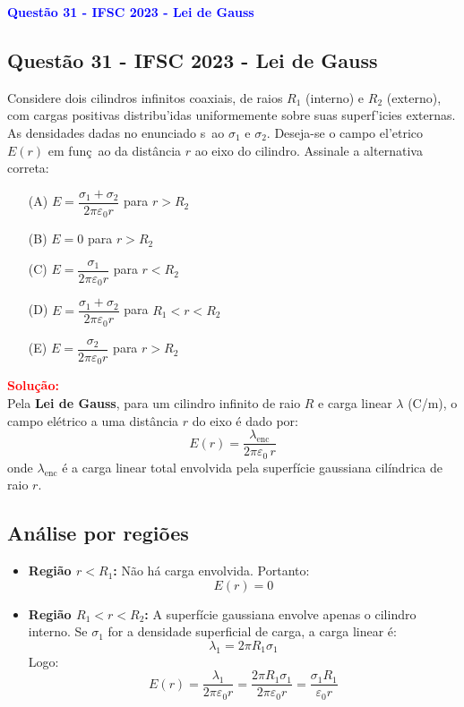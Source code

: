 \begin{flushleft}
\textbf{\textcolor{blue}{\Large Quest\~ao 31 - IFSC 2023 - Lei de Gauss}}\
\noindent

\subsection{Quest\~ao 31 - IFSC 2023 - Lei de Gauss}
Considere dois cilindros infinitos coaxiais, de raios $R_1$ (interno) e $R_2$ (externo), com cargas positivas distribu'idas 
uniformemente sobre suas superf'icies externas. As densidades dadas no enunciado s~ao $\sigma_1$ e $\sigma_2$. 
Deseja-se o campo el'etrico $E(r)$ em fun\c{c}~ao da dist\^ancia $r$ ao eixo do cilindro. Assinale a alternativa correta:

\begin{itemize}
\item[(A)] $E = \dfrac{\sigma_1+\sigma_2}{2\pi\varepsilon_0 r}$ para $r>R_2$
\item[(B)] $E = 0$ para $r>R_2$
\item[(C)] $E = \dfrac{\sigma_1}{2\pi\varepsilon_0 r}$ para $r<R_2$
\item[(D)] $E = \dfrac{\sigma_1+\sigma_2}{2\pi\varepsilon_0 r}$ para $R_1<r<R_2$
\item[(E)] $E = \dfrac{\sigma_2}{2\pi\varepsilon_0 r}$ para $r>R_2$
\end{itemize}

\vspace{0.5cm}

\textcolor{red}{\textbf{Solução:}}\\

Pela \textbf{Lei de Gauss}, para um cilindro infinito de raio $R$ e carga linear $\lambda$ (C/m), o campo elétrico a uma distância $r$ do eixo é dado por:
\[
E(r) = \frac{\lambda_{\text{enc}}}{2\pi \varepsilon_0 \, r}
\]
onde $\lambda_{\text{enc}}$ é a carga linear total envolvida pela superfície gaussiana cilíndrica de raio $r$.

\subsection*{Análise por regiões}

\begin{itemize}
    \item \textbf{Região $r < R_1$:}  
    Não há carga envolvida. Portanto:
    \[
    E(r) = 0
    \]

    \item \textbf{Região $R_1 < r < R_2$:}  
    A superfície gaussiana envolve apenas o cilindro interno. Se $\sigma_1$ for a densidade superficial de carga, a carga linear é:
    \[
    \lambda_1 = 2\pi R_1 \sigma_1
    \]
    Logo:
    \[
    E(r) = \frac{\lambda_1}{2\pi \varepsilon_0 r} 
          = \frac{2\pi R_1 \sigma_1}{2\pi \varepsilon_0 r} 
          = \frac{\sigma_1 R_1}{\varepsilon_0 r}
    \]


\end{itemize}
\end{flushleft}
